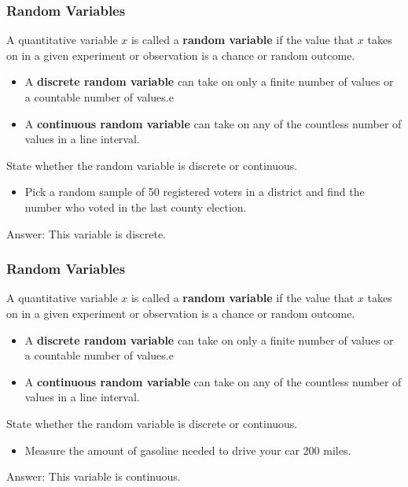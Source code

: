 \documentclass{beamer}
\theoremstyle{definition}
\begin{document}
\begin{frame}
\frametitle{Random Variables}
\begin{definition}
A quantitative variable $x$ is called a \textbf{random variable} if the value that $x$ takes on in a given experiment or observation is a chance or random outcome.
\begin{itemize}
\item A \textbf{discrete random variable} can take on only a finite number of values or a countable number of values.e
\item A \textbf{continuous random variable} can take on any of the countless number of values in a line interval.
\end{itemize}
\end{definition}
\begin{example}
State whether the random variable is discrete or continuous.
\begin{itemize}
\item Pick a random sample of 50 registered voters in a district and find the number who voted in the last county election.
\end{itemize}\pause
\begin{flushright}Answer: This variable is discrete.\end{flushright}
\end{example}
\end{frame}

\begin{frame}
\frametitle{Random Variables}
\begin{definition}
A quantitative variable $x$ is called a \textbf{random variable} if the value that $x$ takes on in a given experiment or observation is a chance or random outcome.
\begin{itemize}
\item A \textbf{discrete random variable} can take on only a finite number of values or a countable number of values.e
\item A \textbf{continuous random variable} can take on any of the countless number of values in a line interval.
\end{itemize}
\end{definition}
\begin{example}
State whether the random variable is discrete or continuous.
\begin{itemize}
\item Measure the amount of gasoline needed to drive your car 200 miles.
\end{itemize}\pause
\begin{flushright}Answer: This variable is continuous.\end{flushright}
\end{example}
\end{frame}
\end{document}

